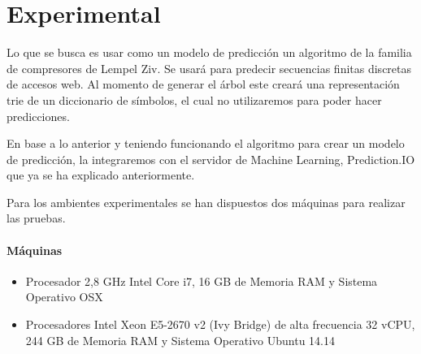 \chapter[Experimental]{Experimental}






Lo que se busca es usar como un modelo de predicción un algoritmo de la familia de compresores de Lempel Ziv. Se usará para predecir secuencias finitas discretas de accesos web. Al momento de generar el árbol este creará una representación trie de un diccionario de símbolos, el cual no utilizaremos para poder hacer predicciones.

En base a lo anterior y teniendo funcionando el algoritmo para crear un modelo de predicción, la integraremos con el servidor de Machine Learning, Prediction.IO que ya se ha explicado anteriormente.




Para los ambientes experimentales se han dispuestos dos máquinas para realizar las pruebas.

\subsubsection{Máquinas}
\begin{itemize}
	\item Procesador 2,8 GHz Intel Core i7, 16 GB de Memoria RAM y Sistema Operativo OSX
	\item Procesadores Intel Xeon E5-2670 v2 (Ivy Bridge) de alta frecuencia 32 vCPU, 244 GB de Memoria RAM y Sistema Operativo Ubuntu 14.14 
\end{itemize}

